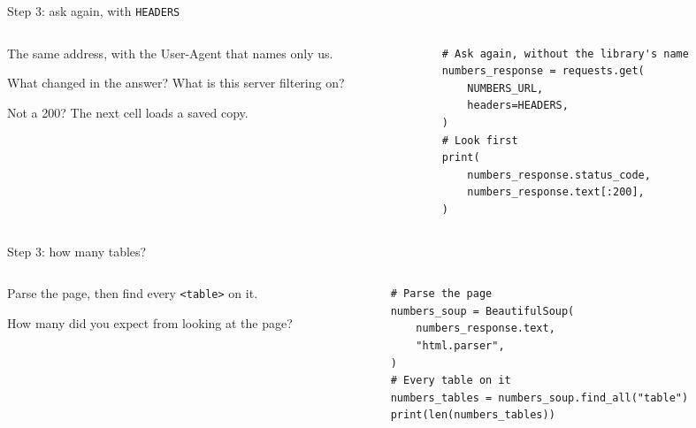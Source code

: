 \documentclass[9pt,aspectratio=169]{beamer}
\begin{document}
\begin{frame}[fragile]{Step 3: ask again, with \texttt{HEADERS}}
    \begin{columns}[T]
        \begin{column}{0.37\textwidth}
            The same address, with the User-Agent that names only us.

            \medskip
            What changed in the answer? What is this server filtering on?

            \medskip
            Not a 200? The next cell loads a saved copy.
        \end{column}
        \begin{column}{0.6\textwidth}
\begin{lstlisting}
# Ask again, without the library's name
numbers_response = requests.get(
    NUMBERS_URL,
    headers=HEADERS,
)
# Look first
print(
    numbers_response.status_code,
    numbers_response.text[:200],
)
\end{lstlisting}
        \end{column}
    \end{columns}
\end{frame}

\begin{frame}[fragile]{Step 3: how many tables?}
    \begin{columns}[T]
        \begin{column}{0.37\textwidth}
            Parse the page, then find every \texttt{<table>} on it.

            \medskip
            How many did you expect from looking at the page?
        \end{column}
        \begin{column}{0.6\textwidth}
\begin{lstlisting}
# Parse the page
numbers_soup = BeautifulSoup(
    numbers_response.text,
    "html.parser",
)
# Every table on it
numbers_tables = numbers_soup.find_all("table")
print(len(numbers_tables))
\end{lstlisting}
        \end{column}
    \end{columns}
\end{frame}
\end{document}
